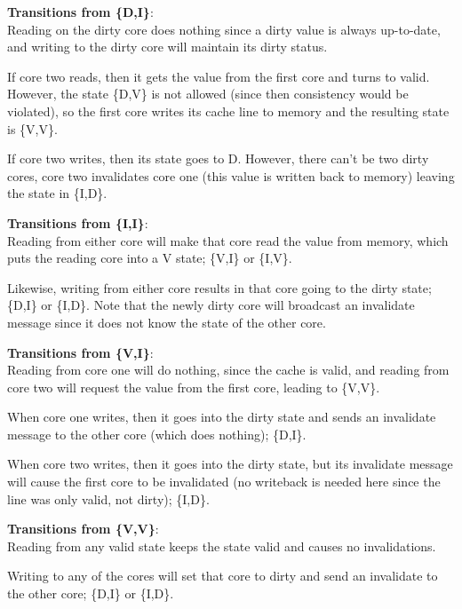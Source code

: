 \begin{description}
  \item \textbf{Transitions from \{D,I\}}:\\ Reading on the dirty core
  does nothing since a dirty value is always up-to-date, and writing
  to the dirty core will maintain its dirty status.

  If core two reads, then it gets the value from the first core and
  turns to valid. However, the state \{D,V\} is not allowed (since
  then consistency would be violated), so the first core writes its
  cache line to memory and the resulting state is \{V,V\}.

  If core two writes, then its state goes to D. However, there can't
  be two dirty cores, core two invalidates core one (this value is
  written back to memory) leaving the state in \{I,D\}.

  \item \textbf{Transitions from \{I,I\}}:\\ Reading from either core
  will make that core read the value from memory, which puts the
  reading core into a V state; \{V,I\} or \{I,V\}.

  Likewise, writing from either core results in that core going to the
  dirty state; \{D,I\} or \{I,D\}. Note that the newly dirty core will
  broadcast an invalidate message since it does not know the state of
  the other core.

  \item \textbf{Transitions from \{V,I\}}:\\ Reading from core one
  will do nothing, since the cache is valid, and reading from core two
  will request the value from the first core, leading to \{V,V\}.

  When core one writes, then it goes into the dirty state and sends an
  invalidate message to the other core (which does nothing); \{D,I\}.

  When core two writes, then it goes into the dirty state, but its
  invalidate message will cause the first core to be invalidated (no
  writeback is needed here since the line was only valid, not
  dirty); \{I,D\}.

  \item \textbf{Transitions from \{V,V\}}:\\ Reading from any valid
  state keeps the state valid and causes no invalidations.

  Writing to any of the cores will set that core to dirty and send an
  invalidate to the other core; \{D,I\} or \{I,D\}.
\end{description}

